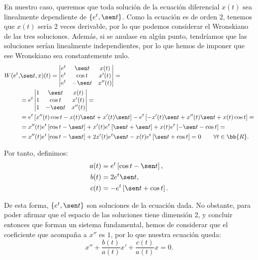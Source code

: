 \documentclass[12pt]{article}
\begin{document}
\begin{ejercicio}
\begin{description}
            En nuestro caso, queremos que toda solución de la ecuación diferencial $x(t)$ sea linealmente dependiente de $\{e^t,\sen t\}$. Como la ecuación es de orden $2$, tenemos que $x(t)$ sería $2$ veces derivable, por lo que podemos considerar el Wronskiano de las tres soluciones. Además, si se anulase en algún punto, tendríamos que las soluciones serían linealmente independientes, por lo que hemos de imponer que ese Wronskiano sea constantemente nulo.
            \begin{align*}
                W(e^t,&\sen t,x)(t)=\begin{vmatrix}
                    e^t & \sen t & x(t)\\
                    e^t & \cos t & x'(t)\\
                    e^t & -\sen t & x''(t)
                \end{vmatrix}
                =\\&=e^t\begin{vmatrix}
                    1 & \sen t & x(t)\\
                    1 & \cos t & x'(t)\\
                    1 & -\sen t & x''(t)
                \end{vmatrix}
                =\\&= e^t\left[x''(t)\cos t-x(t)\sen t+x'(t)\sen t\right]
                -e^t\left[-x'(t)\sen t+x''(t)\sen t +x(t)\cos t\right]
                =\\&= x''(t)e^t\left[\cos t-\sen t\right]+x'(t)e^t\left[\sen t+\sen t\right]+x(t)e^t\left[-\sen t-\cos t\right]
                =\\&= x''(t)e^t\left[\cos t-\sen t\right]+2x'(t)e^t\sen t-x(t)e^t\left[\sen t+\cos t\right]=0 \qquad \forall t\in\bb{R}.
            \end{align*}

            Por tanto, definimos:
            \begin{align*}
                a(t)&=e^t\left[\cos t-\sen t\right],\\
                b(t)&=2e^t\sen t,\\
                c(t)&=-e^t\left[\sen t+\cos t\right].
            \end{align*}

            De esta forma, $\{e^t,\sen t\}$ son soluciones de la ecuación dada. No obstante, para poder afirmar que el espacio de las soluciones tiene dimensión $2$, y concluir entonces que forman un sistema fundamental, hemos de considerar que el coeficiente que acompaña a $x''$ es $1$, por lo que nuestra ecuación queda:
            \begin{equation*}
                x''+\dfrac{b(t)}{a(t)}x'+\dfrac{c(t)}{a(t)}x=0.
            \end{equation*}


\end{description}
\end{ejercicio}
\end{document}
